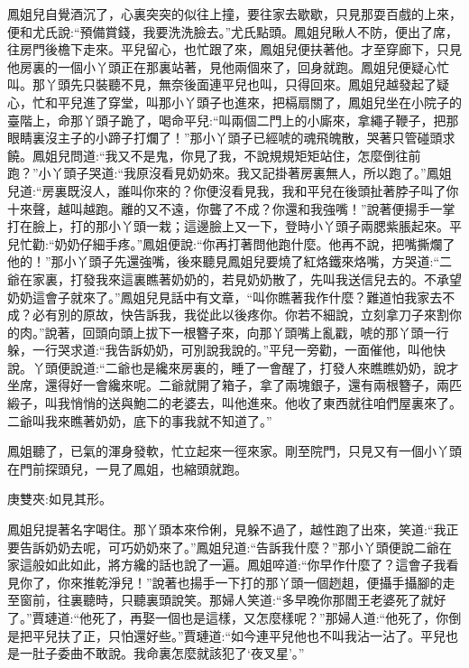\begin{parag}
    鳳姐兒自覺酒沉了，心裏突突的似往上撞，要往家去歇歇，只見那耍百戲的上來，便和尤氏說:“預備賞錢，我要洗洗臉去。”尤氏點頭。鳳姐兒瞅人不防，便出了席，往房門後檐下走來。平兒留心，也忙跟了來，鳳姐兒便扶著他。才至穿廊下，只見他房裏的一個小丫頭正在那裏站著，見他兩個來了，回身就跑。鳳姐兒便疑心忙叫。那丫頭先只裝聽不見，無奈後面連平兒也叫，只得回來。鳳姐兒越發起了疑心，忙和平兒進了穿堂，叫那小丫頭子也進來，把槅扇關了，鳳姐兒坐在小院子的臺階上，命那丫頭子跪了，喝命平兒:“叫兩個二門上的小廝來，拿繩子鞭子，把那眼睛裏沒主子的小蹄子打爛了！”那小丫頭子已經唬的魂飛魄散，哭著只管碰頭求饒。鳳姐兒問道:“我又不是鬼，你見了我，不說規規矩矩站住，怎麼倒往前跑？”小丫頭子哭道:“我原沒看見奶奶來。我又記掛著房裏無人，所以跑了。”鳳姐兒道:“房裏既沒人，誰叫你來的？你便沒看見我，我和平兒在後頭扯著脖子叫了你十來聲，越叫越跑。離的又不遠，你聾了不成？你還和我強嘴！”說著便揚手一掌打在臉上，打的那小丫頭一栽；這邊臉上又一下，登時小丫頭子兩腮紫脹起來。平兒忙勸:“奶奶仔細手疼。”鳳姐便說:“你再打著問他跑什麼。他再不說，把嘴撕爛了他的！”那小丫頭子先還強嘴，後來聽見鳳姐兒要燒了紅烙鐵來烙嘴，方哭道:“二爺在家裏，打發我來這裏瞧著奶奶的，若見奶奶散了，先叫我送信兒去的。不承望奶奶這會子就來了。”鳳姐兒見話中有文章，“叫你瞧著我作什麼？難道怕我家去不成？必有別的原故，快告訴我，我從此以後疼你。你若不細說，立刻拿刀子來割你的肉。”說著，回頭向頭上拔下一根簪子來，向那丫頭嘴上亂戳，唬的那丫頭一行躲，一行哭求道:“我告訴奶奶，可別說我說的。”平兒一旁勸，一面催他，叫他快說。丫頭便說道:“二爺也是纔來房裏的，睡了一會醒了，打發人來瞧瞧奶奶，說才坐席，還得好一會纔來呢。二爺就開了箱子，拿了兩塊銀子，還有兩根簪子，兩匹緞子，叫我悄悄的送與鮑二的老婆去，叫他進來。他收了東西就往咱們屋裏來了。二爺叫我來瞧著奶奶，底下的事我就不知道了。”
\end{parag}


\begin{parag}
    鳳姐聽了，已氣的渾身發軟，忙立起來一徑來家。剛至院門，只見又有一個小丫頭在門前探頭兒，一見了鳳姐，也縮頭就跑。\begin{note}庚雙夾:如見其形。\end{note}鳳姐兒提著名字喝住。那丫頭本來伶俐，見躲不過了，越性跑了出來，笑道:“我正要告訴奶奶去呢，可巧奶奶來了。”鳳姐兒道:“告訴我什麼？”那小丫頭便說二爺在家這般如此如此，將方纔的話也說了一遍。鳳姐啐道:“你早作什麼了？這會子我看見你了，你來推乾淨兒！”說著也揚手一下打的那丫頭一個趔趄，便攝手攝腳的走至窗前，往裏聽時，只聽裏頭說笑。那婦人笑道:“多早晚你那閻王老婆死了就好了。”賈璉道:“他死了，再娶一個也是這樣，又怎麼樣呢？”那婦人道:“他死了，你倒是把平兒扶了正，只怕還好些。”賈璉道:“如今連平兒他也不叫我沾一沾了。平兒也是一肚子委曲不敢說。我命裏怎麼就該犯了‘夜叉星’。”
\end{parag}


